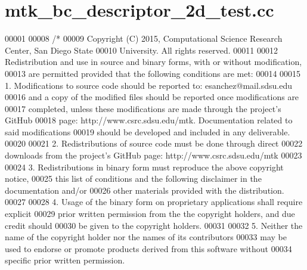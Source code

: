 \hypertarget{mtk__bc__descriptor__2d__test_8cc_source}{\section{mtk\+\_\+bc\+\_\+descriptor\+\_\+2d\+\_\+test.\+cc}
\label{mtk__bc__descriptor__2d__test_8cc_source}
}

\begin{DoxyCode}
00001 
00008 \textcolor{comment}{/*}
00009 \textcolor{comment}{Copyright (C) 2015, Computational Science Research Center, San Diego State}
00010 \textcolor{comment}{University. All rights reserved.}
00011 \textcolor{comment}{}
00012 \textcolor{comment}{Redistribution and use in source and binary forms, with or without modification,}
00013 \textcolor{comment}{are permitted provided that the following conditions are met:}
00014 \textcolor{comment}{}
00015 \textcolor{comment}{1. Modifications to source code should be reported to: esanchez@mail.sdsu.edu}
00016 \textcolor{comment}{and a copy of the modified files should be reported once modifications are}
00017 \textcolor{comment}{completed, unless these modifications are made through the project's GitHub}
00018 \textcolor{comment}{page: http://www.csrc.sdsu.edu/mtk. Documentation related to said modifications}
00019 \textcolor{comment}{should be developed and included in any deliverable.}
00020 \textcolor{comment}{}
00021 \textcolor{comment}{2. Redistributions of source code must be done through direct}
00022 \textcolor{comment}{downloads from the project's GitHub page: http://www.csrc.sdsu.edu/mtk}
00023 \textcolor{comment}{}
00024 \textcolor{comment}{3. Redistributions in binary form must reproduce the above copyright notice,}
00025 \textcolor{comment}{this list of conditions and the following disclaimer in the documentation and/or}
00026 \textcolor{comment}{other materials provided with the distribution.}
00027 \textcolor{comment}{}
00028 \textcolor{comment}{4. Usage of the binary form on proprietary applications shall require explicit}
00029 \textcolor{comment}{prior written permission from the the copyright holders, and due credit should}
00030 \textcolor{comment}{be given to the copyright holders.}
00031 \textcolor{comment}{}
00032 \textcolor{comment}{5. Neither the name of the copyright holder nor the names of its contributors}
00033 \textcolor{comment}{may be used to endorse or promote products derived from this software without}
00034 \textcolor{comment}{specific prior written permission.}

\end{DoxyCode}
